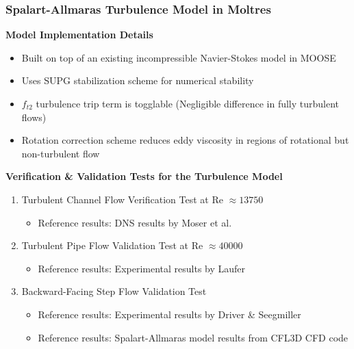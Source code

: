 \begin{frame}
  \frametitle{Spalart-Allmaras Turbulence Model in Moltres}
  \begin{block}{\textbf{Model Implementation Details}}
  \begin{itemize}
    \item Built on top of an existing incompressible Navier-Stokes model in MOOSE
    \item Uses \gls{SUPG} stabilization scheme for numerical stability
    \item $f_{t2}$ turbulence trip term is togglable (Negligible difference in fully turbulent flows)
    \item Rotation correction scheme \cite{aupoix_extensions_2003, dacles-mariani_numericalexperimental_1995}
      reduces eddy viscosity in regions of rotational but non-turbulent flow
  \end{itemize}
  \end{block}
  \pause
  \begin{block}{\textbf{Verification \& Validation Tests for the Turbulence Model}}
    \begin{enumerate}
      \item Turbulent Channel Flow Verification Test at Re $\approx 13750$
      \begin{itemize}
        \item Reference results: \gls{DNS} results by Moser et al.\ \cite{moser_direct_1999}
      \end{itemize}
      \item Turbulent Pipe Flow Validation Test at Re $\approx 40000$
      \begin{itemize}
        \item Reference results: Experimental results by Laufer \cite{laufer_structure_1954}
      \end{itemize}
      \item Backward-Facing Step Flow Validation Test
      \begin{itemize}
        \item Reference results: Experimental results by Driver \& Seegmiller \cite{driver_features_1985}
        \item Reference results: Spalart-Allmaras model results from CFL3D CFD code \cite{krist_cfl3d_1998}
      \end{itemize}
    \end{enumerate}
  \end{block}
\end{frame}

